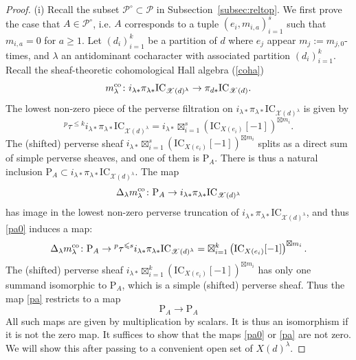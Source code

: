 \documentclass [11pt,oneside,a4paper,mathscr]{amsart}
\theoremstyle{definition}
\renewcommand{\leq}{\leqslant}
\renewcommand{\geq}{\geqslant}
\newcommand{\X}{\mathscr{X}}
\begin{document}
\begin{proof}
    (i) 
   Recall the subset $\mathscr{P}^{\circ} \subset \mathscr{P}$ in Subsection~\ref{subsec:reltop}. 
We first prove the case that $A \in \mathscr{P}^{\circ}$, i.e. 
$A$ corresponds to a tuple $(e_i, m_{i, a})_{i=1}^s$ such that 
$m_{i, a}=0$ for $a\geq 1$. 
Let $(d_i)_{i=1}^k$ be a partition of $d$
where $e_j$ appear $m_{j}:=m_{j, 0}$-times, and $\lambda$ 
an antidominant cocharacter with associated partition $(d_i)_{i=1}^k$. 
    Recall the sheaf-theoretic cohomological Hall algebra (\ref{coha})
    \begin{align*}
        m_{\lambda}^{\rm{co}} \colon i_{\lambda\ast}\pi_{\lambda*}\mathrm{IC}_{\X(d)^{\lambda}} \to 
        \pi_{d\ast}\mathrm{IC}_{\X(d)}. 
    \end{align*}
   The lowest non-zero piece of the perverse filtration on $i_{\lambda \ast}\pi_{\lambda*}\mathrm{IC}_{\X(d)^{\lambda}}$ is given by \[
    {}^p\tau^{\leq k}i_{\lambda \ast}\pi_{\lambda*}\mathrm{IC}_{\X(d)^\lambda}=i_{\lambda \ast}\boxtimes_{i=1}^s\left(\mathrm{IC}_{X(e_i)}[-1]\right)^{\boxtimes m_i}.\]
    The (shifted) perverse sheaf $i_{\lambda\ast}\boxtimes_{i=1}^s\left(\mathrm{IC}_{X(e_i)}[-1]\right)^{\boxtimes m_i}$ splits as a direct sum of simple perverse sheaves, and one of 
    them is $\mathrm{P}_A$. 
    There is thus a natural inclusion $\mathrm{P}_A\subset i_{\lambda \ast}\pi_{\lambda*}\mathrm{IC}_{\X(d)^\lambda}$.
    The map \begin{equation}\label{pa0}
    \Delta_\lambda m_\lambda^{\rm{co}}\colon \mathrm{P}_A\to i_{\lambda \ast}\pi_{\lambda*}\mathrm{IC}_{\X(d)^\lambda}
   \end{equation}
    has image in the lowest non-zero perverse truncation of $i_{\lambda \ast}\pi_{\lambda*}\mathrm{IC}_{\X(d)^\lambda}$,
    and thus \eqref{pa0} induces a map:
    \begin{equation}\label{pa}
    \Delta_\lambda m_\lambda^{\rm{co}}\colon \mathrm{P}_A\to {}^p\tau^{\leq s}i_{\lambda \ast}\pi_{\lambda*}\mathrm{IC}_{\X(d)^\lambda}=\boxtimes_{i=1}^k\left(\mathrm{IC}_{X(e_i)}[-1]\right)^{\boxtimes m_i}.
   \end{equation}
    The (shifted) perverse sheaf $i_{\lambda \ast}\boxtimes_{i=1}^k\left(\mathrm{IC}_{X(e_i)}[-1]\right)^{\boxtimes m_i}$ has only one summand isomorphic to $\mathrm{P}_A$, which is a simple (shifted) perverse sheaf. Thus the map \eqref{pa} restricts to a map 
    \begin{equation}\label{pa2}
        \mathrm{P}_A\to \mathrm{P}_A
    \end{equation} 
    All such maps are given by multiplication by scalars. It is thus an isomorphism if it is not the zero map. It suffices to show that the maps \eqref{pa0} or \eqref{pa} are not zero. We will show this after passing to a convenient open set of $X(d)^\lambda$. %


\end{proof}
\end{document}

